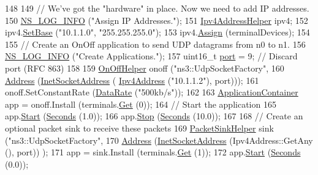 \begin{DoxyCode}
148 
149   \textcolor{comment}{// We've got the "hardware" in place.  Now we need to add IP addresses.}
150   \hyperlink{group__logging_gafbd73ee2cf9f26b319f49086d8e860fb}{NS\_LOG\_INFO} (\textcolor{stringliteral}{"Assign IP Addresses."});
151   \hyperlink{classns3_1_1Ipv4AddressHelper}{Ipv4AddressHelper} ipv4;
152   ipv4.\hyperlink{classns3_1_1Ipv4AddressHelper_acf7b16dd25bac67e00f5e25f90a9a035}{SetBase} (\textcolor{stringliteral}{"10.1.1.0"}, \textcolor{stringliteral}{"255.255.255.0"});
153   ipv4.\hyperlink{classns3_1_1Ipv4AddressHelper_af8e7f4a1a7e74c00014a1eac445a27af}{Assign} (terminalDevices);
154 
155   \textcolor{comment}{// Create an OnOff application to send UDP datagrams from n0 to n1.}
156   \hyperlink{group__logging_gafbd73ee2cf9f26b319f49086d8e860fb}{NS\_LOG\_INFO} (\textcolor{stringliteral}{"Create Applications."});
157   uint16\_t \hyperlink{dsdv-manet_8cc_a8e0798404bf2cf5dabb84c5ba9a4f236}{port} = 9;   \textcolor{comment}{// Discard port (RFC 863)}
158 
159   \hyperlink{classns3_1_1OnOffHelper}{OnOffHelper} onoff (\textcolor{stringliteral}{"ns3::UdpSocketFactory"},
160                      \hyperlink{classns3_1_1Address}{Address} (\hyperlink{classns3_1_1InetSocketAddress}{InetSocketAddress} (
      \hyperlink{classns3_1_1Ipv4Address}{Ipv4Address} (\textcolor{stringliteral}{"10.1.1.2"}), port)));
161   onoff.SetConstantRate (\hyperlink{classns3_1_1DataRate}{DataRate} (\textcolor{stringliteral}{"500kb/s"}));
162 
163   \hyperlink{classns3_1_1ApplicationContainer}{ApplicationContainer} app = onoff.Install (terminals.\hyperlink{classns3_1_1NodeContainer_a9ed96e2ecc22e0f5a3d4842eb9bf90bf}{Get} (0));
164   \textcolor{comment}{// Start the application}
165   app.\hyperlink{classns3_1_1ApplicationContainer_a8eff87926507020bbe3e1390358a54a7}{Start} (\hyperlink{group__timecivil_ga33c34b816f8ff6628e33d5c8e9713b9e}{Seconds} (1.0));
166   app.\hyperlink{classns3_1_1ApplicationContainer_adfc52f9aa4020c8714679b00bbb9ddb3}{Stop} (\hyperlink{group__timecivil_ga33c34b816f8ff6628e33d5c8e9713b9e}{Seconds} (10.0));
167 
168   \textcolor{comment}{// Create an optional packet sink to receive these packets}
169   \hyperlink{classns3_1_1PacketSinkHelper}{PacketSinkHelper} sink (\textcolor{stringliteral}{"ns3::UdpSocketFactory"},
170                          \hyperlink{classns3_1_1Address}{Address} (\hyperlink{classns3_1_1InetSocketAddress}{InetSocketAddress} (Ipv4Address::GetAny (), port))
      );
171   app = sink.Install (terminals.\hyperlink{classns3_1_1NodeContainer_a9ed96e2ecc22e0f5a3d4842eb9bf90bf}{Get} (1));
172   app.\hyperlink{classns3_1_1ApplicationContainer_a8eff87926507020bbe3e1390358a54a7}{Start} (\hyperlink{group__timecivil_ga33c34b816f8ff6628e33d5c8e9713b9e}{Seconds} (0.0));

\end{DoxyCode}
